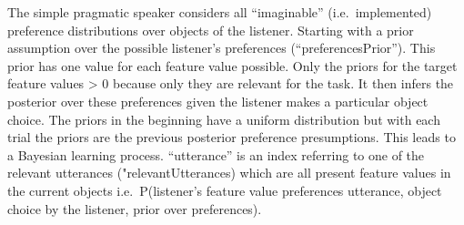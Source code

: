 \documentclass[]{article}
\begin{document}
The simple pragmatic speaker considers all ``imaginable''
(i.e.~implemented) preference distributions over objects of the
listener. Starting with a prior assumption over the possible listener's
preferences (``preferencesPrior''). This prior has one value for each
feature value possible. Only the priors for the target feature values
\textgreater{} 0 because only they are relevant for the task. It then
infers the posterior over these preferences given the listener makes a
particular object choice. The priors in the beginning have a uniform
distribution but with each trial the priors are the previous posterior
preference presumptions. This leads to a Bayesian learning process.
``utterance'' is an index referring to one of the relevant utterances
("relevantUtterances) which are all present feature values in the
current objects i.e.~P(listener's feature value preferences \textbar{}
utterance, object choice by the listener, prior over preferences).
\end{document}
